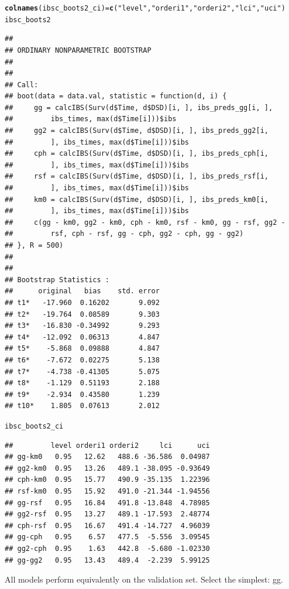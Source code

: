 \documentclass{article}\usepackage[]{graphicx}\usepackage[]{color}
\makeatletter
\newcommand{\hlstr}[1]{\textcolor[rgb]{0.192,0.494,0.8}{#1}}%
\newcommand{\hlstd}[1]{\textcolor[rgb]{0.345,0.345,0.345}{#1}}%
\newcommand{\hlkwb}[1]{\textcolor[rgb]{0.69,0.353,0.396}{#1}}%
\newcommand{\hlkwd}[1]{\textcolor[rgb]{0.737,0.353,0.396}{\textbf{#1}}}%
\newenvironment{kframe}{%
 \def\at@end@of@kframe{}%
 \ifinner\ifhmode%
  \def\at@end@of@kframe{\end{minipage}}%
  \begin{minipage}{\columnwidth}%
 \fi\fi%
 \def\FrameCommand##1{\hskip\@totalleftmargin \hskip-\fboxsep
 \colorbox{shadecolor}{##1}\hskip-\fboxsep
     \hskip-\linewidth \hskip-\@totalleftmargin \hskip\columnwidth}%
 \MakeFramed {\advance\hsize-\width
   \@totalleftmargin\z@ \linewidth\hsize
   \@setminipage}}%
 {\par\unskip\endMakeFramed%
 \at@end@of@kframe}
\newenvironment{knitrout}{}{} %
\makeatother
\begin{document}
\begin{knitrout}
\begin{kframe}
\begin{alltt}
\hlkwd{colnames}\hlstd{(ibsc_boots2_ci)} \hlkwb{=} \hlkwd{c}\hlstd{(}\hlstr{"level"}\hlstd{,} \hlstr{"orderi1"}\hlstd{,} \hlstr{"orderi2"}\hlstd{,} \hlstr{"lci"}\hlstd{,} \hlstr{"uci"}\hlstd{)}
\hlstd{ibsc_boots2}
\end{alltt}
\begin{verbatim}
## 
## ORDINARY NONPARAMETRIC BOOTSTRAP
## 
## 
## Call:
## boot(data = data.val, statistic = function(d, i) {
##     gg = calcIBS(Surv(d$Time, d$DSD)[i, ], ibs_preds_gg[i, ], 
##         ibs_times, max(d$Time[i]))$ibs
##     gg2 = calcIBS(Surv(d$Time, d$DSD)[i, ], ibs_preds_gg2[i, 
##         ], ibs_times, max(d$Time[i]))$ibs
##     cph = calcIBS(Surv(d$Time, d$DSD)[i, ], ibs_preds_cph[i, 
##         ], ibs_times, max(d$Time[i]))$ibs
##     rsf = calcIBS(Surv(d$Time, d$DSD)[i, ], ibs_preds_rsf[i, 
##         ], ibs_times, max(d$Time[i]))$ibs
##     km0 = calcIBS(Surv(d$Time, d$DSD)[i, ], ibs_preds_km0[i, 
##         ], ibs_times, max(d$Time[i]))$ibs
##     c(gg - km0, gg2 - km0, cph - km0, rsf - km0, gg - rsf, gg2 - 
##         rsf, cph - rsf, gg - cph, gg2 - cph, gg - gg2)
## }, R = 500)
## 
## 
## Bootstrap Statistics :
##      original   bias    std. error
## t1*   -17.960  0.16202       9.092
## t2*   -19.764  0.08589       9.303
## t3*   -16.830 -0.34992       9.293
## t4*   -12.092  0.06313       4.847
## t5*    -5.868  0.09888       4.847
## t6*    -7.672  0.02275       5.138
## t7*    -4.738 -0.41305       5.075
## t8*    -1.129  0.51193       2.188
## t9*    -2.934  0.43580       1.239
## t10*    1.805  0.07613       2.012
\end{verbatim}
\begin{alltt}
\hlstd{ibsc_boots2_ci}
\end{alltt}
\begin{verbatim}
##         level orderi1 orderi2     lci      uci
## gg-km0   0.95   12.62   488.6 -36.586  0.04987
## gg2-km0  0.95   13.26   489.1 -38.095 -0.93649
## cph-km0  0.95   15.77   490.9 -35.135  1.22396
## rsf-km0  0.95   15.92   491.0 -21.344 -1.94556
## gg-rsf   0.95   16.84   491.8 -13.848  4.78985
## gg2-rsf  0.95   13.27   489.1 -17.593  2.48774
## cph-rsf  0.95   16.67   491.4 -14.727  4.96039
## gg-cph   0.95    6.57   477.5  -5.556  3.09545
## gg2-cph  0.95    1.63   442.8  -5.680 -1.02330
## gg-gg2   0.95   13.43   489.4  -2.239  5.99125
\end{verbatim}
\end{kframe}
\end{knitrout}
All models perform equivalently on the validation set.  Select the simplest: gg.
\end{document}
